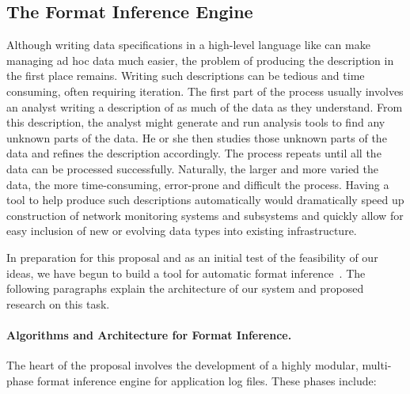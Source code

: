 \subsection{The Format Inference Engine}
\label{sec:inference}

Although writing data specifications in a high-level language like
\pads{} can make managing ad hoc data much easier,
the problem of producing the description in the first place
remains. Writing such descriptions can be tedious and time consuming,
often requiring iteration. The first part of the process usually
involves an analyst writing a description of as
much of the data as they understand. From this description, the analyst
might generate and run analysis tools to find any unknown parts of the
data. He or she then studies those unknown parts of the data and refines the description
accordingly.   The process repeats until all the data can be processed successfully.
Naturally, the larger and more varied the data, the more time-consuming,
error-prone and difficult the process.  Having a tool to help produce such 
descriptions automatically would dramatically speed up construction of
network monitoring systems and subsystems and quickly allow for easy inclusion of
new or evolving data types into existing infrastructure.






In preparation for this proposal and as an initial test of the
feasibility of our ideas, we have begun to build a tool for automatic
format inference~\cite{Fisher+:dirttoshovels}.  The following paragraphs explain the architecture
of our system and proposed research on this task.

\paragraph*{Algorithms and Architecture for Format Inference.}
The heart of the proposal involves the development of a highly modular, multi-phase
format inference engine for application log files.  These phases include:


